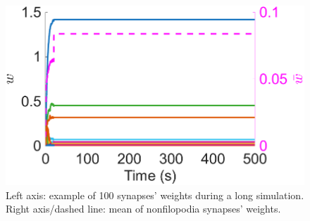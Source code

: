 \documentclass[utf8]{FrontiersinHarvard} %
\begin{document}
\begin{subfigure}
\begin{minipage}[b]{0.21\textwidth}
        \caption{}
        \label{figs:results:network_end}
    \end{minipage}%
\setcounter{figure}{2}
\setcounter{subfigure}{-1}
    \caption{Typical network dynamics. {\textbf{(A)}} Firing rates of the network's neurons. {\textbf{(B)}} Sorted firing rate of the network's neurons for when they first fire $\ge\SI{100}{\hertz}$. {\textbf{(C)}} Change in the firing rate from after learning to the end of the simulation. {\textbf{(D)}} Weights, $w$, at the end of the simulation. {\textbf{(E)}} Actual potentiation amount as a percentage of that determined by the STDP window. {\textbf{(F)}} Left axis: example of \SI{100}{} synapses' weights. Right axis/dashed line: mean of nonfilopodia synapses' weights. {\textbf{(G)}} Distance between nonfilopodia spines. {\textbf{(H)}} Resource pools, $p$. {\textbf{(I)}} Mean in degree, out degree, in closeness, and out closeness during the simulation. {\textbf{(J)}} Network of neurons after learning. {\textbf{(K)}} Weight change after learning. {\textbf{(L)}} Network of neurons at the end of the simulation. {\textbf{(J)}} and {\textbf{(L)}} Only the strongest \SI{10}{\percent} are shown. Line width represents weight.}
    \label{figs:results:typical}
\end{subfigure}

\begin{subfigure}
\setcounter{figure}{3}
\setcounter{subfigure}{0}
    \begin{minipage}[b]{0.32\textwidth}
        \includegraphics[width=\linewidth]{rbSTDP_long/weights_E2E_traces.pdf}
    \end{minipage}%

\setcounter{figure}{3}
\setcounter{subfigure}{-1}
    \caption{Left axis: example of \SI{100}{} synapses' weights during a long simulation. Right axis/dashed line: mean of nonfilopodia synapses' weights.}
    \label{figs:results:long}
\end{subfigure}
\end{document}
